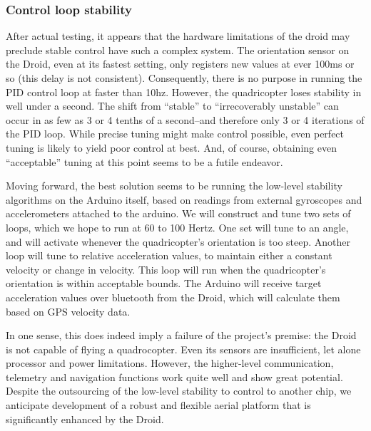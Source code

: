 \subsubsection{Control loop stability}
\label{sec:cls}
After actual testing, it appears that the hardware limitations of the
droid may preclude stable control have such a complex system.  The
orientation sensor on the Droid, even at its fastest setting, only
registers new values at ever 100ms or so (this delay is not
consistent).  Consequently, there is no purpose in running the PID
control loop at faster than 10hz.  However, the quadricopter loses
stability in well under a second.  The shift from ``stable'' to
``irrecoverably unstable'' can occur in as few as 3 or 4 tenths of a
second--and therefore only 3 or 4 iterations of the PID loop.  While
precise tuning might make control possible, even perfect tuning is
likely to yield poor control at best.  And, of course, obtaining even
``acceptable'' tuning at this point seems to be a futile endeavor.

Moving forward, the best solution seems to be running the low-level
stability algorithms on the Arduino itself, based on readings from
external gyroscopes and accelerometers attached to the arduino.  We
will construct and tune two sets of loops, which we hope to run at 60
to 100 Hertz.  One set will tune to an angle, and will activate
whenever the quadricopter’s orientation is too steep.  Another loop
will tune to relative acceleration values, to maintain either a
constant velocity or change in velocity.  This loop will run when the
quadricopter’s orientation is within acceptable bounds.  The Arduino
will receive target acceleration values over bluetooth from the Droid,
which will calculate them based on GPS velocity data.

In one sense, this does indeed imply a failure of the project’s
premise: the Droid is not capable of flying a quadrocopter.  Even its
sensors are insufficient, let alone processor and power limitations.
However, the higher-level communication, telemetry and navigation
functions work quite well and show great potential.  Despite the
outsourcing of the low-level stability to control to another chip, we
anticipate development of a robust and flexible aerial platform that
is significantly enhanced by the Droid.

\newpage
\appendix
